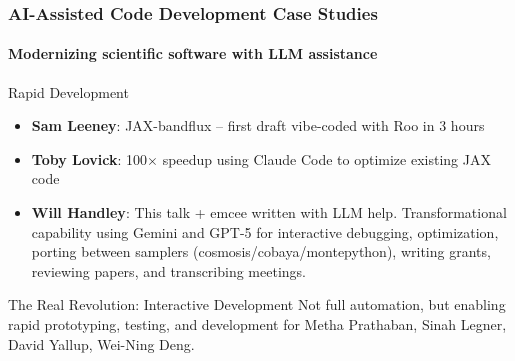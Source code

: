 \documentclass[aspectratio=169]{beamer}
\begin{document}
\begin{frame}
    \frametitle{AI-Assisted Code Development Case Studies}
    \framesubtitle{Modernizing scientific software with LLM assistance}

    \begin{block}{Rapid Development}
        \begin{itemize}
            \item \textbf{Sam Leeney}: JAX-bandflux  -- first draft vibe-coded with Roo in 3 hours
            \item \textbf{Toby Lovick}: 100$\times$ speedup using Claude Code to optimize existing JAX code 
            \item \textbf{Will Handley}: This talk + emcee  written with LLM help. Transformational capability using Gemini and GPT-5 for interactive debugging, optimization, porting between samplers (cosmosis/cobaya/montepython), writing grants, reviewing papers, and transcribing meetings.
        \end{itemize}
    \end{block}

    \begin{alertblock}{The Real Revolution: Interactive Development}
        Not full automation, but enabling rapid prototyping, testing, and development for Metha Prathaban, Sinah Legner, David Yallup, Wei-Ning Deng.
    \end{alertblock}
\end{frame}
\end{document}
